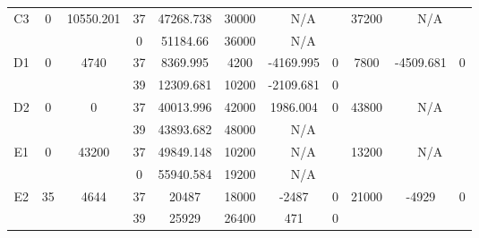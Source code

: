 \begin{sidewaystable}
\begin{tabular}{c||c|c||c|c|c|c|c||c|c|c}
         &
        
      \\
      \hline
      \multirow{2}{*}{C3} &
      \multirow{2}{*}{0} &
      \multirow{2}{*}{10550.201} &
      37 &
      47268.738 &
      30000 &
        \multicolumn{2}{|c||}{N/A} &
      \multirow{2}{*}{37200} &
        \multicolumn{2}{c}{\multirow{2}{*}{N/A}}
      \\
      \cline{4-8}
       &
       &
       &
      0 &
      51184.66 &
      36000 &
        \multicolumn{2}{|c||}{N/A} &
      
        
      \\
      \hline
      \multirow{2}{*}{D1} &
      \multirow{2}{*}{0} &
      \multirow{2}{*}{4740} &
      37 &
      8369.995 &
      4200 &
        -4169.995 &
        0 &
      \multirow{2}{*}{7800} &
        \multirow{2}{*}{-4509.681} &
        \multirow{2}{*}{0}
      \\
      \cline{4-8}
       &
       &
       &
      39 &
      12309.681 &
      10200 &
        -2109.681 &
        0 &
      
         &
        
      \\
      \hline
      \multirow{2}{*}{D2} &
      \multirow{2}{*}{0} &
      \multirow{2}{*}{0} &
      37 &
      40013.996 &
      42000 &
        1986.004 &
        0 &
      \multirow{2}{*}{43800} &
        \multicolumn{2}{c}{\multirow{2}{*}{N/A}}
      \\
      \cline{4-8}
       &
       &
       &
      39 &
      43893.682 &
      48000 &
        \multicolumn{2}{|c||}{N/A} &
      
        
      \\
      \hline
      \multirow{2}{*}{E1} &
      \multirow{2}{*}{0} &
      \multirow{2}{*}{43200} &
      37 &
      49849.148 &
      10200 &
        \multicolumn{2}{|c||}{N/A} &
      \multirow{2}{*}{13200} &
        \multicolumn{2}{c}{\multirow{2}{*}{N/A}}
      \\
      \cline{4-8}
       &
       &
       &
      0 &
      55940.584 &
      19200 &
        \multicolumn{2}{|c||}{N/A} &
      
        
      \\
      \hline
      \multirow{2}{*}{E2} &
      \multirow{2}{*}{35} &
      \multirow{2}{*}{4644} &
      37 &
      20487 &
      18000 &
        -2487 &
        0 &
      \multirow{2}{*}{21000} &
        \multirow{2}{*}{-4929} &
        \multirow{2}{*}{0}
      \\
      \cline{4-8}
       &
       &
       &
      39 &
      25929 &
      26400 &
        471 &
        0 &
      

\end{tabular}
\end{sidewaystable}
